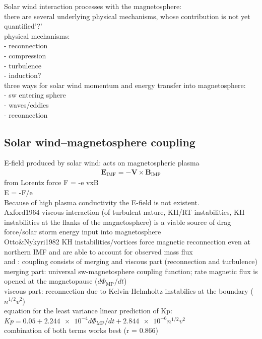 Solar wind interaction processes with the magnetosphere:\\
there are several underlying physical mechanisms, whose contribution is not yet quantified'?'\\
physical mechanisms:\\
- reconnection\\
- compression\\
- turbulence\\
- induction?\\

three ways for solar wind momentum and energy transfer into magnetosphere:\\
- sw entering sphere\\
- waves/eddies\\
- reconnection\\


\subsection{Solar wind--magnetosphere coupling}

E-field produced by solar wind:	%
acts on magnetospheric plasma\\
\begin{align}
	\textbf{E}_\text{IMF} = -\textbf{V} \times \textbf{B}_\text{IMF}
\end{align}
from Lorentz force F = -e vxB\\
E = -F/e\\
Because of high plasma conductivity the E-field is not existent.\\

Axford1964 viscous interaction (of turbulent nature, KH/RT instabilities, KH instabilities at the flanks of the magnetosphere) is a viable source of drag force/solar storm energy input into magnetosphere\\

Otto\&Nykyri1982 KH instabilities/vortices force magnetic reconnection even at northern IMF and are able to account for observed mass flux\\

\citet{Newell2007} and \citet{Newell2008}: coupling consists of merging and viscous part (reconnection and turbulence)\\
merging part: universal sw-magnetosphere coupling function; rate magnetic flux is opened at the magnetopause ($d\Phi_\text{MP}/dt$)\\
viscous part: reconnection due to Kelvin-Helmholtz instabilies at the boundary ($n^{1/2} v^2$)\\
equation for the least variance linear prediction of Kp: $Kp = 0.05 + \num{2.244e-4} d\Phi_\text{MP}/dt + \num{2.844e-6} n^{1/2} v^2$\\
combination of both terms works best (r = 0.866)\\

